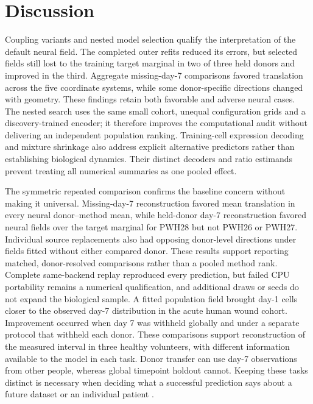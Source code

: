 \section{Discussion}

Coupling variants and nested model selection qualify the interpretation of the default neural field. The completed outer refits reduced its errors, but selected fields still lost to the training target marginal in two of three held donors and improved in the third. Aggregate missing-day-7 comparisons favored translation across the five coordinate systems, while some donor-specific directions changed with geometry. These findings retain both favorable and adverse neural cases. The nested search uses the same small cohort, unequal configuration grids and a discovery-trained encoder; it therefore improves the computational audit without delivering an independent population ranking. Training-cell expression decoding and mixture shrinkage also address explicit alternative predictors rather than establishing biological dynamics. Their distinct decoders and ratio estimands prevent treating all numerical summaries as one pooled effect.

The symmetric repeated comparison confirms the baseline concern without making it universal. Missing-day-7 reconstruction favored mean translation in every neural donor--method mean, while held-donor day-7 reconstruction favored neural fields over the target marginal for PWH28 but not PWH26 or PWH27. Individual source replacements also had opposing donor-level directions under fields fitted without either compared donor. These results support reporting matched, donor-resolved comparisons rather than a pooled method rank. Complete same-backend replay reproduced every prediction, but failed CPU portability remains a numerical qualification, and additional draws or seeds do not expand the biological sample.
A fitted population field brought day-1 cells closer to the observed day-7 distribution in the acute human wound cohort. Improvement occurred when day 7 was withheld globally and under a separate protocol that withheld each donor. These comparisons support reconstruction of the measured interval in three healthy volunteers, with different information available to the model in each task. Donor transfer can use day-7 observations from other people, whereas global timepoint holdout cannot. Keeping these tasks distinct is necessary when deciding what a successful prediction says about a future dataset or an individual patient \citep{liu2025_wound,roberts2017}.

